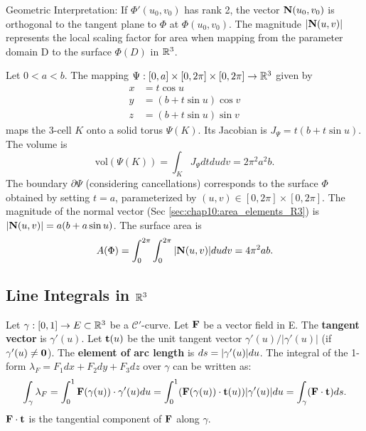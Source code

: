 Geometric Interpretation: If $\Phi'(u_0, v_0)$ has rank 2, the vector
$\mathbf{N}(u_0, v_0)$ is orthogonal to the tangent plane to $\Phi$ at
$\Phi(u_0, v_0)$. The magnitude $|\mathbf{N}(u, v)|$ represents the
local scaling factor for area when mapping from the parameter domain
D to the surface $\Phi(D)$ in $\mathbb{R}^3$.



\begin{example}
  \label{ex:chap10:torus_volume_area}
  Let $0 < a < b$. The mapping $\Psi: [0, a] \times [0, 2\pi] \times
  [0, 2\pi] \to \mathbb{R}^3$ given by
  \begin{align*}
    x &= t \cos u \\
    y &= (b + t \sin u) \cos v \\
    z &= (b + t \sin u) \sin v
  \end{align*}
  maps the 3-cell $K$ onto a solid torus $\Psi(K)$. Its Jacobian is
  $J_\Psi = t(b + t \sin u)$. The volume is
  \[
    \text{vol}(\Psi(K)) = \int_K J_\Psi dt du dv = 2\pi^2 a^2 b.
  \]
  The boundary $\partial \Psi$ (considering cancellations)
  corresponds to the surface $\Phi$ obtained by setting $t=a$,
  parameterized by $(u, v) \in [0, 2\pi] \times [0, 2\pi]$. The
  magnitude of the normal vector (Sec
  \ref{sec:chap10:area_elements_R3}) is $|\mathbf{N}(u, v)| = a(b + a
  \sin u)$. The surface area is
  \[
    A(\Phi) = \int_0^{2\pi} \int_0^{2\pi} |\mathbf{N}(u, v)| du dv = 4\pi^2 ab.
  \]
\end{example}

\subsection*{Line Integrals in $\mathbb{R}^3$}
\label{sec:chap10:line_integrals_R3}
Let $\gamma: [0, 1] \to E \subset \mathbb{R}^3$ be a $\mathcal{C}'$-curve.
Let $\mathbf{F}$ be a vector field in E. The \textbf{tangent vector} is
$\gamma'(u)$. Let $\mathbf{t}(u)$ be the unit tangent vector
$\gamma'(u)/|\gamma'(u)|$ (if $\gamma'(u) \ne \mathbf{0}$). The
\textbf{element of arc length} is $ds = |\gamma'(u)| du$. The
integral of the 1-form $\lambda_F = F_1 dx + F_2 dy + F_3 dz$ over
$\gamma$ can be written as:
\[
  \int_\gamma \lambda_F = \int_0^1 \mathbf{F}(\gamma(u)) \cdot
  \gamma'(u) du = \int_0^1 (\mathbf{F}(\gamma(u)) \cdot \mathbf{t}(u))
  |\gamma'(u)| du = \int_\gamma (\mathbf{F} \cdot \mathbf{t}) ds.
\]
$\mathbf{F} \cdot \mathbf{t}$ is the tangential component of $\mathbf{F}$
along $\gamma$.

